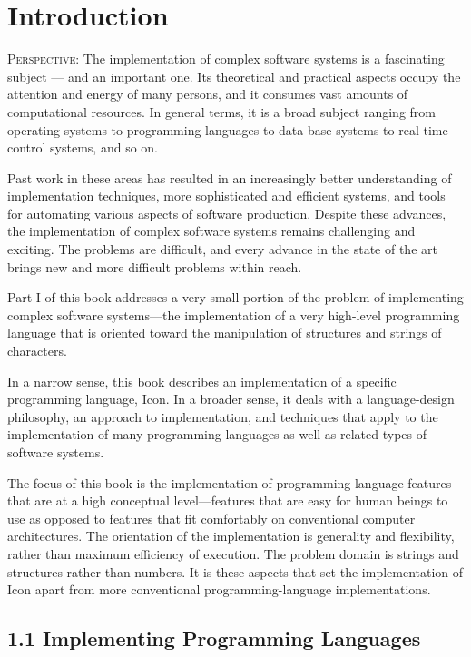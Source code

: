 \chapter{Introduction}

\textsc{Perspective}: The implementation of complex software systems
is a fascinating subject --- and an important one. Its theoretical and
practical aspects occupy the attention and energy of many persons, and
it consumes vast amounts of computational resources. In general terms,
it is a broad subject ranging from operating systems to programming
languages to data-base systems to real-time control systems, and so
on.


Past work in these areas has resulted in an increasingly better
understanding of implementation techniques, more sophisticated and
efficient systems, and tools for automating various aspects of
software production. Despite these advances, the implementation of
complex software systems remains challenging and exciting. The
problems are difficult, and every advance in the state of the art
brings new and more difficult problems within reach.


Part I of this book addresses a very small portion of the problem of
implementing complex software systems{}---the implementation of a very
high-level programming language that is oriented toward the
manipulation of structures and strings of characters.


In a narrow sense, this book describes an implementation of a specific
programming language, Icon. In a broader sense, it deals with a
language-design philosophy, an approach to implementation, and
techniques that apply to the implementation of many programming
languages as well as related types of software systems.


The focus of this book is the implementation of programming language
features that are at a high conceptual level{}---features that are
easy for human beings to use as opposed to features that fit
comfortably on conventional computer architectures. The orientation of
the implementation is generality and flexibility, rather than maximum
efficiency of execution. The problem domain is strings and structures
rather than numbers. It is these aspects that set the implementation
of Icon apart from more conventional programming-language
implementations.

\section[1.1 Implementing Programming Languages]{1.1 Implementing Programming Languages}

